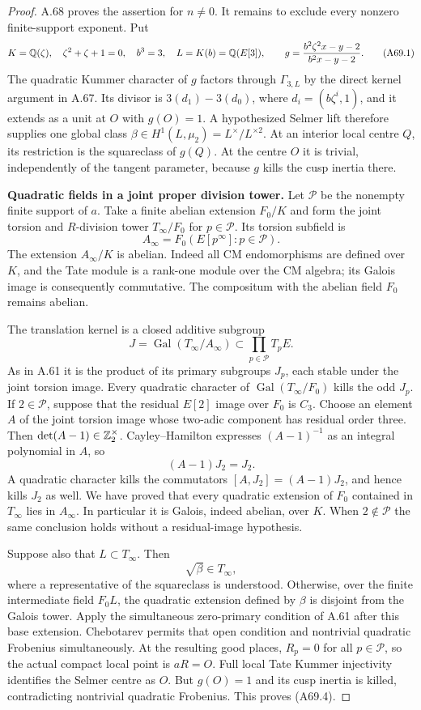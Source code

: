 \begin{proof}
A.68 proves the assertion for $n\ne0$. It remains to exclude
every nonzero finite-support exponent. Put
\[
 K=\mathbb Q(\zeta),\quad \zeta^2+\zeta+1=0,\quad b^3=3,
 \quad L=K(b)=\mathbb Q(E[3]),\qquad
 g=\frac{b^2\zeta^2x-y-2}{b^2x-y-2}.
 \tag{A69.1}
\]
The quadratic Kummer character of $g$ factors through
$\Gamma_{3,L}$ by the direct kernel argument in A.67.
Its divisor is $3(d_1)-3(d_0)$, where
$d_i=(b\zeta^i,1)$, and it extends as a unit at $O$ with
$g(O)=1$. A hypothesized Selmer lift therefore supplies
one global class
$\beta\in H^1(L,\mu_2)=L^\times/L^{\times2}$.
At an interior local centre $Q$, its restriction is the
squareclass of $g(Q)$. At the centre $O$ it is trivial,
independently of the tangent parameter, because $g$ kills
the cusp inertia there.

\par\smallskip\noindent\textbf{Quadratic fields in a joint proper division tower.}\enspace
Let $\mathcal P$ be the nonempty finite support of $a$.
Take a finite abelian extension $F_0/K$ and form the
joint torsion and $R$-division tower $T_\infty/F_0$
for $p\in\mathcal P$. Its torsion subfield is
\[
 A_\infty=F_0(E[p^\infty]:p\in\mathcal P).
\]
The extension $A_\infty/K$ is abelian. Indeed all CM
endomorphisms are defined over $K$, and the Tate module
is a rank-one module over the CM algebra; its Galois
image is consequently commutative. The compositum
with the abelian field $F_0$ remains abelian.

The translation kernel is a closed additive subgroup
\[
 J=\operatorname{Gal}(T_\infty/A_\infty)
       \subset\prod_{p\in\mathcal P}T_pE.
 \tag{A69.2}
\]
As in A.61 it is the product of its primary subgroups
$J_p$, each stable under the joint torsion image.
Every quadratic character of
$\operatorname{Gal}(T_\infty/F_0)$ kills the odd
$J_p$. If $2\in\mathcal P$, suppose that the residual
$E[2]$ image over $F_0$ is $C_3$. Choose an element
$A$ of the joint torsion image whose two-adic
component has residual order three. Then
$\det(A-1)\in\mathbb Z_2^\times$. Cayley--Hamilton
expresses $(A-1)^{-1}$ as an integral polynomial
in $A$, so
\[
 (A-1)J_2=J_2.
 \tag{A69.3}
\]
A quadratic character kills the commutators
$[A,J_2]=(A-1)J_2$, and hence kills $J_2$ as well.
We have proved that every quadratic extension of
$F_0$ contained in $T_\infty$ lies in $A_\infty$.
In particular it is Galois, indeed abelian, over $K$.
When $2\notin\mathcal P$ the same conclusion holds
without a residual-image hypothesis.

Suppose also that $L\subset T_\infty$. Then
\[
 \sqrt\beta\in T_\infty,
 \tag{A69.4}
\]
where a representative of the squareclass is understood.
Otherwise, over the finite intermediate field
$F_0L$, the quadratic extension defined by $\beta$
is disjoint from the Galois tower. Apply the
simultaneous zero-primary condition of A.61 after
this base extension. Chebotarev permits that open
condition and nontrivial quadratic Frobenius
simultaneously. At the resulting good places,
$R_p=0$ for all $p\in\mathcal P$, so the actual
compact local point is $aR=O$. Full local Tate
Kummer injectivity identifies the Selmer centre
as $O$. But $g(O)=1$ and its cusp inertia is
killed, contradicting nontrivial quadratic
Frobenius. This proves (A69.4).


\end{proof}
